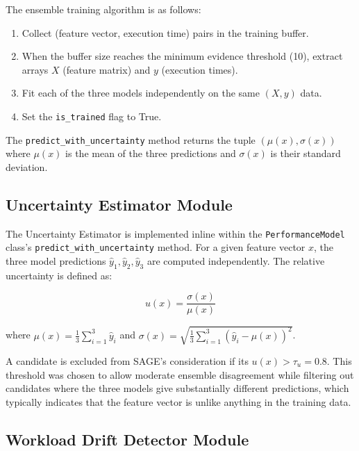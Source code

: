 The ensemble training algorithm is as follows:

\begin{enumerate}
  \item Collect (feature vector, execution time) pairs in the training buffer.
  \item When the buffer size reaches the minimum evidence threshold (10), extract
        arrays $X$ (feature matrix) and $y$ (execution times).
  \item Fit each of the three models independently on the same $(X, y)$ data.
  \item Set the \texttt{is\_trained} flag to True.
\end{enumerate}

The \texttt{predict\_with\_uncertainty} method returns the tuple
$(\mu(x), \sigma(x))$ where $\mu(x)$ is the mean of the three predictions
and $\sigma(x)$ is their standard deviation.

\subsection{Uncertainty Estimator Module}
\label{subsec:uncertainty}

The Uncertainty Estimator is implemented inline within the
\texttt{PerformanceModel} class's \texttt{predict\_with\_uncertainty} method.
For a given feature vector $x$, the three model predictions
$\hat{y}_1, \hat{y}_2, \hat{y}_3$ are computed independently. The relative
uncertainty is defined as:

\begin{equation}
  u(x) = \frac{\sigma(x)}{\mu(x)}
  \label{eq:uncertainty}
\end{equation}

where $\mu(x) = \frac{1}{3}\sum_{i=1}^{3}\hat{y}_i$ and
$\sigma(x) = \sqrt{\frac{1}{3}\sum_{i=1}^{3}(\hat{y}_i - \mu(x))^2}$.

A candidate is excluded from SAGE's consideration if its $u(x) > \tau_u = 0.8$.
This threshold was chosen to allow moderate ensemble disagreement while
filtering out candidates where the three models give substantially different
predictions, which typically indicates that the feature vector is unlike
anything in the training data.

\subsection{Workload Drift Detector Module}
\label{subsec:drift_detector}

